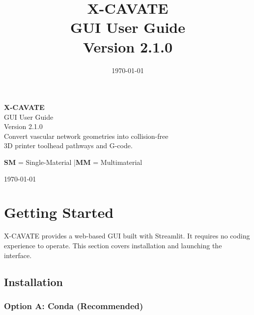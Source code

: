 \documentclass[11pt,letterpaper]{article}
\title{
    \vspace{-1cm}
    \textbf{\Huge X-CAVATE}\\[8pt]
    \LARGE GUI User Guide\\[6pt]
    \large Version 2.1.0
}
\author{}
\date{\today}
\begin{document}
\begin{titlepage}
\centering
\vspace*{3cm}

{\Huge \textbf{X-CAVATE}}\\[12pt]
{\LARGE GUI User Guide}\\[20pt]
{\large Version 2.1.0}\\[40pt]

{\large Convert vascular network geometries into collision-free\\[4pt]
3D printer toolhead pathways and G-code.}

\vspace{2cm}

{\normalsize
\textbf{SM} = Single-Material \quad|\quad \textbf{MM} = Multimaterial
}

\vfill

{\normalsize \today}

\end{titlepage}

\tableofcontents
\newpage

\section{Getting Started}

X-CAVATE provides a web-based GUI built with Streamlit. It requires no coding
experience to operate. This section covers installation and launching the
interface.

\subsection{Installation}

\subsubsection{Option A: Conda (Recommended)}
\end{document}
